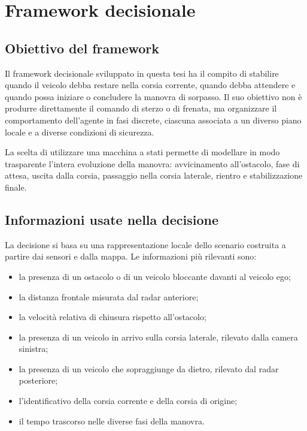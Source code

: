 \chapter{Framework decisionale}

\section{Obiettivo del framework}

Il framework decisionale sviluppato in questa tesi ha il compito di stabilire quando il veicolo debba restare nella corsia corrente, quando debba attendere e quando possa iniziare o concludere la manovra di sorpasso. Il suo obiettivo non è produrre direttamente il comando di sterzo o di frenata, ma organizzare il comportamento dell'agente in fasi discrete, ciascuna associata a un diverso piano locale e a diverse condizioni di sicurezza.

La scelta di utilizzare una macchina a stati permette di modellare in modo trasparente l'intera evoluzione della manovra: avvicinamento all'ostacolo, fase di attesa, uscita dalla corsia, passaggio nella corsia laterale, rientro e stabilizzazione finale.

\section{Informazioni usate nella decisione}

La decisione si basa su una rappresentazione locale dello scenario costruita a partire dai sensori e dalla mappa. Le informazioni più rilevanti sono:

\begin{itemize}
    \item la presenza di un ostacolo o di un veicolo bloccante davanti al veicolo ego;
    \item la distanza frontale misurata dal radar anteriore;
    \item la velocità relativa di chiusura rispetto all'ostacolo;
    \item la presenza di un veicolo in arrivo sulla corsia laterale, rilevato dalla camera sinistra;
    \item la presenza di un veicolo che sopraggiunge da dietro, rilevato dal radar posteriore;
    \item l'identificativo della corsia corrente e della corsia di origine;
    \item il tempo trascorso nelle diverse fasi della manovra.
\end{itemize}

